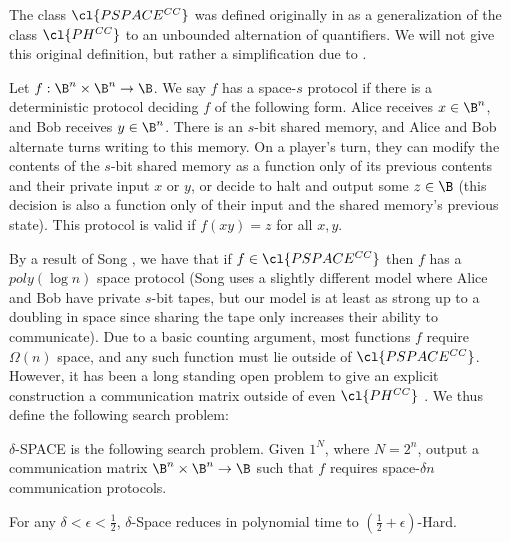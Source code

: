 The class $\cl{PSPACE^{CC}}$ was defined originally in \cite{communication-classes} as a generalization of the class $\cl{PH^{CC}}$ to an unbounded alternation of quantifiers. We will not give this original definition, but rather a simplification due to \cite{space-communication}.

\begin{definition}
Let $f: \B^n \times \B^n \rightarrow \B$. We say $f$ has a space-$s$ protocol if there is a deterministic protocol deciding $f$ of the following form. Alice receives $x \in \B^n$, and Bob receives $y \in \B^n$. There is an $s$-bit shared memory, and Alice and Bob alternate turns writing to this memory. On a player's turn, they can modify the contents of the $s$-bit shared memory as a function only of its previous contents and their private input $x$ or $y$, or decide to halt and output some $z \in \B$ (this decision is also a function only of their input and the shared memory's previous state). This protocol is valid if $f(xy) = z$ for all $x,y$.
\end{definition}


By a result of Song \cite{space-communication}, we have that if $f  \in \cl{PSPACE^{CC}}$ then $f$ has a $poly(\log n)$ space protocol (Song uses a slightly different model where Alice and Bob have private $s$-bit tapes, but our model is at least as strong up to a doubling in space since sharing the tape only increases their ability to communicate). Due to a basic counting argument, most functions $f$ require $\Omega(n)$ space, and any such function must lie outside of $ \cl{PSPACE^{CC}}$. However, it has been a long standing open problem to give an explicit construction a communication matrix outside of even $\cl{PH^{CC}}$ \cite{space-communication}. We thus define the following search problem:

\begin{definition}
{\sc $\delta$-SPACE} is the following search problem. Given $1^N$, where $N=2^n$, output a communication matrix $\B^n \times \B^n \rightarrow \B$ such that $f$ requires space-$\delta n$ communication protocols.
\end{definition}

\begin{theorem}\label{thm:space-circuit}
For any $\delta < \epsilon < \frac{1}{2}$, {\sc $\delta$-Space} reduces in polynomial time to {\sc $(\frac{1}{2} + \epsilon)$-Hard}.
\end{theorem}

